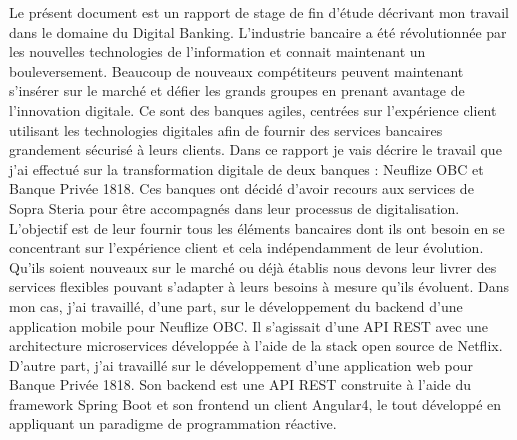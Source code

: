 
	Le présent document est un rapport de stage de fin d'étude décrivant mon travail dans le domaine du Digital Banking. L'industrie bancaire a été révolutionnée par les nouvelles technologies de l'information et connait maintenant un bouleversement. Beaucoup de nouveaux compétiteurs peuvent maintenant s'insérer sur le marché et défier les grands groupes en prenant avantage de l'innovation digitale. Ce sont des banques agiles, centrées sur l'expérience client utilisant les technologies digitales afin de fournir des services bancaires grandement sécurisé à leurs clients. Dans ce rapport je vais décrire le travail que j'ai effectué sur la transformation digitale de deux banques : Neuflize OBC et Banque Privée 1818. Ces banques ont décidé d'avoir recours aux services de Sopra Steria pour être accompagnés dans leur processus de digitalisation. L'objectif est de leur fournir tous les éléments bancaires dont ils ont besoin en se concentrant sur l'expérience client et cela indépendamment de leur évolution. Qu'ils soient nouveaux sur le marché ou déjà établis nous devons leur livrer des services flexibles pouvant s'adapter à leurs besoins à mesure qu'ils évoluent. Dans mon cas, j'ai travaillé, d'une part, sur le développement du backend d'une application mobile pour Neuflize OBC. Il s'agissait d'une API REST avec une architecture microservices développée à l'aide de la stack open source de Netflix. D'autre part, j'ai travaillé sur le développement d'une application web pour Banque Privée 1818. Son backend est une API REST construite à l'aide du framework Spring Boot et son frontend un client Angular4, le tout développé en appliquant un paradigme de programmation réactive.